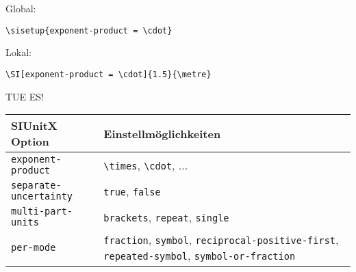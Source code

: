 \documentclass["WS\space 16-17\space -\space LaTeX-Kurs\space -\space Praesentation\space -\space 3.tex"]{subfiles}
\begin{document}
\begin{frame}[fragile]
\begin{center}
\begin{tabular}{l >{\raggedright\arraybackslash}p{3cm} >{\raggedright\arraybackslash}p{1.5cm}}
			\bottomrule
		\end{tabular}
	\end{center}
	Global:\vspace{-0.1cm}
	\begin{lstlisting}
\sisetup{exponent-product = \cdot}
	\end{lstlisting}
	\vspace{-0.2cm}Lokal:\vspace{-0.1cm}
	\begin{lstlisting}
\SI[exponent-product = \cdot]{1.5}{\metre}
	\end{lstlisting}
\end{frame}
\begin{frame}[fragile]
	\begin{Aufgabe}
		TUE ES!
	\end{Aufgabe}
	\btVFill\Befehle
	\begin{center}
		\begin{tabular}{l >{\raggedright\arraybackslash}p{5cm}}
			\toprule
			SIUnitX Option						&	Einstellmöglichkeiten										\\ \midrule
			\lstinline|exponent-product|		&	\lstinline|\times|, \lstinline|\cdot|, ...					\\
			\lstinline|separate-uncertainty|	&	\lstinline|true|, \lstinline|false|							\\
			\lstinline|multi-part-units|		&	\lstinline|brackets|, \lstinline|repeat|, \lstinline|single|	\\
			\lstinline|per-mode|				&	\lstinline|fraction|, \lstinline|symbol|, \lstinline|reciprocal-positive-first|, \lstinline|repeated-symbol|, \lstinline|symbol-or-fraction|	\\
			\bottomrule
		\end{tabular}
	\end{center}
	\vspace{0.1cm}
\end{frame}
\end{document}
